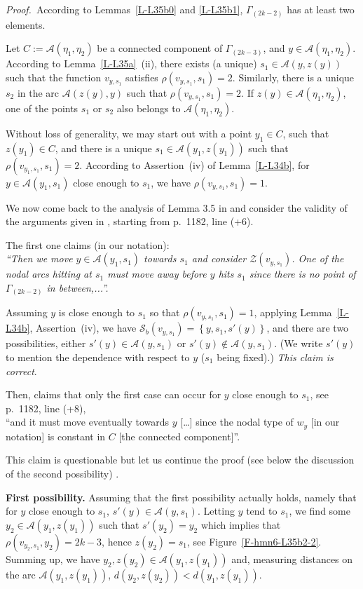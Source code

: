 \documentclass[12pt,a4paper]{amsart}
\theoremstyle{plain} %
\theoremstyle{definition}
\numberwithin{equation}{section}
\numberwithin{figure}{section}
\numberwithin{table}{section}
\newcommand{\cA}{\mathcal{A}}
\newcommand{\cS}{\mathcal{S}}
\newcommand{\cZ}{\mathcal{Z}}
\newcommand{\pf}{\emph{Proof.~}}
\newcommand{\set}[1]{\left\lbrace #1 \right\rbrace}
\begin{document}
\pf According to Lemmas~\ref{L-L35b0} and \ref{L-L35b1}, $\Gamma_{(2k-2)}$ has at least two elements.\smallskip

Let $C:=\cA(\eta_1,\eta_2)$ be a connected component of $\Gamma_{(2k-3)}$, and $y \in \cA(\eta_1,\eta_2)$. According to Lemma~\ref{L-L35a}~(ii), there exists (a unique) $s_1 \in \cA(y,z(y))$ such that the function $v_{y,s_1}$ satisfies $\rho(v_{y,s_1},s_1)=2$. Similarly, there is a unique $s_2$ in the arc $\cA(z(y),y)$ such that $\rho(v_{y,s_1},s_1)=2$. If $z(y) \in \cA(\eta_1,\eta_2)$, one of the points $s_1$ or $s_2$ also belongs to  $\cA(\eta_1,\eta_2)$. \smallskip

Without loss of generality, we may start out with a point $y_1 \in C$, such that $z(y_1) \in C$,  and there is a unique $s_1 \in \cA(y_1,z(y_1))$ such that $\rho(v_{y_1,s_1}, s_1)=2$. According to Assertion~(iv) of Lemma~\ref{L-L34b}, for $y \in \cA(y_1,s_1)$ close enough to $s_1$, we have $\rho(v_{y,s_1},s_1)=1$. \medskip

We now  come back to the analysis of Lemma 3.5 in \cite{HoMN1999} and consider the validity of the arguments given in \cite{HoMN1999}, starting from p.~1182, line (+6). \smallskip

The first one claims (in our notation):\\
{\it ``Then we move $y \in \cA(y_1,s_1)$ towards $s_1$ and consider $\cZ(v_{y,s_1})$. One of the nodal arcs hitting at $s_1$ must move away before $y$ hits $s_1$ since there is no point of $\Gamma_{(2k -2)}$ in between,...''.}\smallskip

Assuming $y$ is close enough to $s_1$ so that $\rho(v_{y,s_1},s_1)=1$, applying  Lemma~\ref{L-L34b}, Assertion~(iv), we have $\cS_b(v_{y,s_1}) = \set{y,s_1,s'(y)}$, and there are two possibilities, either $s'(y) \in \cA(y,s_1)$ or $s'(y) \not \in \cA(y,s_1)$. (We write $s'(y)$ to mention the dependence with respect to $y$ ($s_1$ being fixed).) \emph{This claim is correct}.\smallskip

Then, \cite{HoMN1999} claims that only the first case can occur for $y$ close enough to $s_1$, see p.~1182, line (+8),\\ ``and it must move eventually towards $y$ [\ldots] since the nodal type of $w_y$ [in our notation] is constant in $C$ [the connected component]''.\smallskip

This claim is questionable but let us continue the proof (see below the discussion of the second possibility) .\smallskip

{\bf First possibility.} Assuming that  the first possibility actually holds, namely that for $y$ close enough to $s_1$, $s'(y) \in \cA(y,s_1)$. Letting $y$ tend to $s_1$, we find some $y_2 \in \cA(y_1,z(y_1))$ such that $s'(y_2)=y_2$ which implies that $\rho ( v_{y_2,s_1} , y_2)=2k-3$, hence  $z(y_2) = s_1$, see Figure~\ref{F-hmn6-L35b2-2}.  Summing up, we have $y_2, z(y_2) \in \cA(y_1,z(y_1))$ and, measuring distances on the arc $\cA(y_1,z(y_1))$, $d(y_2,z(y_2)) < d(y_1,z(y_1))$. \smallskip
\end{document}
